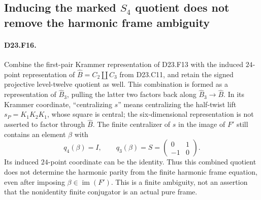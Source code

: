 \subsection{Inducing the marked $S_4$ quotient does not remove the harmonic frame ambiguity}

\paragraph{D23.F16.}
Combine the first-pair Krammer representation of D23.F13
with the induced $24$-point representation of
$\widehat B=C_2\amalg C_3$ from D23.C11, and retain
the signed projective level-twelve quotient as well.
This combination is formed as a representation of
$\widehat B_3$, pulling the latter two factors back
along $\widehat B_3\to\widehat B$. In its Krammer
coordinate, ``centralizing $s$'' means centralizing
the half-twist lift $s_P=K_1K_2K_1$, whose square
is central; the six-dimensional representation is
not asserted to factor through $\widehat B$.
The finite centralizer of $s$ in the image of $F'$
still contains an element $\beta$ with
\[
 q_4(\beta)=I,\qquad q_3(\beta)=S
 =\begin{pmatrix}0&1\\-1&0\end{pmatrix}.
\tag{D23.F16.1}
\]
Its induced $24$-point coordinate can be the identity.
Thus this combined quotient does not determine the
harmonic parity from the finite harmonic frame equation,
even after imposing $\beta\in\operatorname{im}(F')$.
This is a finite ambiguity, not an assertion that the
nonidentity finite conjugator is an actual pure frame.

